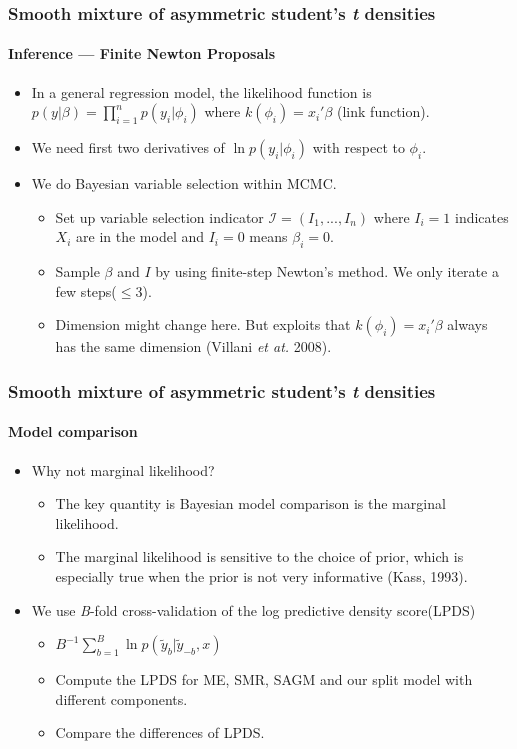 \documentclass[10pt]{beamer}
\begin{document}
\begin{frame}
\frametitle{Smooth mixture of asymmetric student's {\em t} densities}
\framesubtitle{Inference --- Finite Newton Proposals}
\begin{itemize}
\item In a general regression model, the likelihood function is $p\left( {y|\beta } \right) = \prod\nolimits_{i = 1}^n
  {p\left( {y_i |\phi _i } \right)} $ where $k\left( {\phi _i } \right) = x_i '\beta $ (link function).
\item We need first two derivatives of $\ln p(y_i|\phi_i)$ with respect to $\phi_i$.
\item We do Bayesian variable selection within MCMC. 
\begin{itemize}
\item Set up variable selection indicator $\mathcal{I}=(I_1,...,I_n)$ where $I_i=1$
  indicates $X_i$ are in the model and $I_i=0$ means $\beta_i=0$. 
\item Sample $\beta$ and $I$ by using finite-step Newton's method. We only iterate a few
  steps($\leq$3). 
\item Dimension might change
  here. But exploits that $k(\phi_i)=x_i'\beta$ always has the same dimension (Villani \emph{et at.} 2008).
\end{itemize}

\end{itemize}
\end{frame}


\begin{frame}
\frametitle{Smooth mixture of asymmetric student's {\em t} densities}
\framesubtitle{Model comparison}
\begin{itemize}
\item Why not marginal likelihood?

  \begin{itemize}
  \item The key quantity is Bayesian model comparison is the marginal likelihood.
  \item The marginal likelihood is sensitive to the choice of prior, which is especially true when
    the prior is not very informative (Kass, 1993).  
  \end{itemize}
\item We use \emph{B}-fold cross-validation of the log predictive density score(LPDS) 

  \begin{itemize}
  \item $B^{ - 1} \sum\limits_{b = 1}^B {\ln p\left( {\tilde y_b |\tilde y_{ - b} ,x}
      \right)} $ 

  \item Compute the LPDS for ME, SMR, SAGM and our split model with different components.
  \item Compare the differences of LPDS. 
  \end{itemize}

\end{itemize}
\end{frame}
\end{document}
